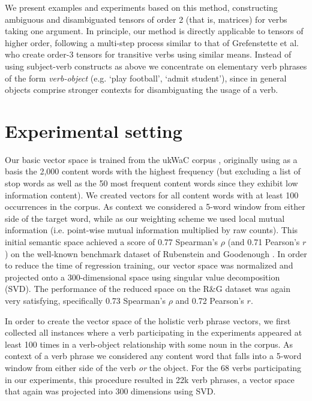 \documentclass[11pt]{article}
\begin{document}
We present examples and experiments based on this method, constructing ambiguous and disambiguated tensors of order 2 (that is, matrices) for verbs taking one argument. In principle, our method is directly applicable to tensors of higher order, following a multi-step process similar to that of Grefenstette et al.  who create order-3 tensors for transitive verbs using similar means. Instead of using subject-verb constructs as above we concentrate on elementary verb phrases of the form \textit{verb-object} (e.g. `play football', `admit student'), since in general objects comprise stronger contexts for disambiguating the usage of a verb.

\section{Experimental setting}
\label{sec:setting}

Our basic vector space is trained from the ukWaC corpus \cite{ukwac}, originally using as a basis the 2,000 content words with the highest frequency (but excluding a list of stop words as well as the 50 most frequent content words since they exhibit low information content). We created vectors for all content words with at least 100 occurrences in the corpus. As context we considered a 5-word window from either side of the target word, while as our weighting scheme we used local mutual information (i.e. point-wise mutual information multiplied by raw counts). This initial semantic space achieved a score of 0.77 Spearman's $\rho$ (and 0.71 Pearson's $r$) on the well-known benchmark dataset of Rubenstein and Goodenough . In order to reduce the time of regression training, our vector space was normalized and projected onto a 300-dimensional space using singular value decomposition (SVD). The performance of the reduced space on the R\&G dataset was again very satisfying, specifically 0.73 Spearman's $\rho$ and 0.72 Pearson's $r$. 

In order to create the vector space of the holistic verb phrase vectors, we first collected all instances where a verb participating in the experiments appeared at least 100 times in a verb-object relationship with some noun in the corpus. As context of a verb phrase we considered any content word that falls into a 5-word window from either side of the verb \textit{or} the object. For the 68 verbs participating in our experiments, this procedure resulted in 22k verb phrases, a vector space that again was projected into 300 dimensions using SVD.
\end{document}
